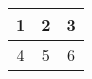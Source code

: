 \documentclass{article}
\begin{document}
\begin{table}[h!]
\centering
\begin{tabular}{ |c|c|c| }
\hline 1 & 2 & 3\\
\hline 4 & 5 & 6\\
\hline
\end{tabular}
\end{table}
\end{document}
